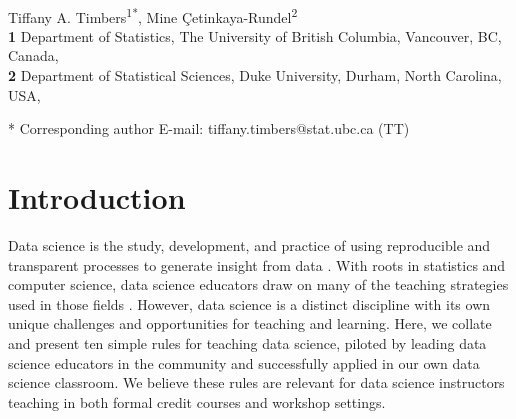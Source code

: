 \documentclass[
  10pt,
  letterpaper,
]{article}
\renewcommand{\figurename}{Fig}
\renewcommand*\figurename{Figure}
\newcommand\figurename{Figure}
\begin{document}
\vspace*{0.2in}

\begin{flushleft}
{\Large
\textbf{} %
}
\newline
\\
Tiffany A. Timbers\textsuperscript{1*}, Mine
Çetinkaya-Rundel\textsuperscript{2}
\\
\bigskip
\textbf{1} Department of Statistics, The University of British Columbia,
Vancouver, BC, Canada, \\ \textbf{2} Department of Statistical Sciences,
Duke University, Durham, North Carolina, USA, 
\bigskip

% 
%
* Corresponding author \newline{}E-mail: tiffany.timbers@stat.ubc.ca
(TT)

\end{flushleft}



\linenumbers
\renewcommand{\figurename}{Fig}


\section{Introduction}\label{sec-intro}

Data science is the study, development, and practice of using
reproducible and transparent processes to generate insight from data
\citep{berman2018realizing, Wing2019Data, Irizarry2020Role, timbers2022data}.
With roots in statistics and computer science, data science educators
draw on many of the teaching strategies used in those fields
\citep{carver2016guidelines, zendler2015, fincher2019cambridge}.
However, data science is a distinct discipline with its own unique
challenges and opportunities for teaching and learning. Here, we collate
and present ten simple rules for teaching data science, piloted by
leading data science educators in the community and successfully applied
in our own data science classroom. We believe these rules are relevant
for data science instructors teaching in both formal credit courses and
workshop settings.
\end{document}
